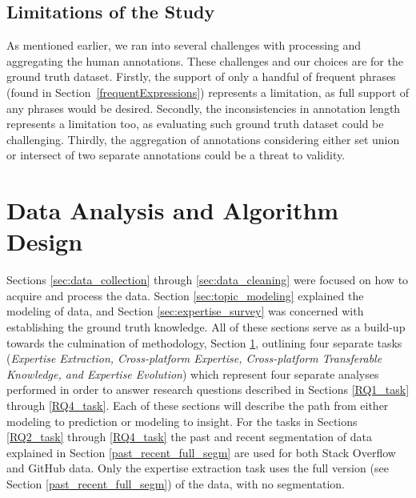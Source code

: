         \subsection{Limitations of the Study}
            As mentioned earlier, we ran into several challenges with processing and aggregating the human annotations. These challenges and our choices are for the ground truth dataset. Firstly, the support of only a handful of frequent phrases (found in Section~\ref{frequentExpressions}) represents a limitation, as full support of any phrases would be desired. Secondly, the inconsistencies in annotation length represents a limitation too, as evaluating such ground truth dataset could be challenging. Thirdly, the aggregation of annotations considering either set union or intersect of two separate annotations could be a threat to validity. %
        
\section{Data Analysis and Algorithm Design} \label{sec:algo_design}

    Sections \ref{sec:data_collection} through \ref{sec:data_cleaning} were focused on how to acquire and process the data. Section \ref{sec:topic_modeling} explained the modeling of data, and Section \ref{sec:expertise_survey} was concerned with establishing the ground truth knowledge. All of these sections serve as a build-up towards the culmination of methodology, Section \ref{sec:algo_design}, outlining four separate tasks (\emph{Expertise Extraction, Cross-platform Expertise, Cross-platform Transferable Knowledge, and Expertise Evolution}) which represent four separate analyses performed in order to answer research questions described in Sections \ref{RQ1_task} through \ref{RQ4_task}. Each of these sections will describe the path from either modeling to prediction or modeling to insight. For the tasks in Sections \ref{RQ2_task} through \ref{RQ4_task} the past and recent segmentation of data explained in Section \ref{past_recent_full_segm} are used for both Stack Overflow and GitHub data. Only the expertise extraction task uses the full version (see Section \ref{past_recent_full_segm}) of the data, with no segmentation. 
    
